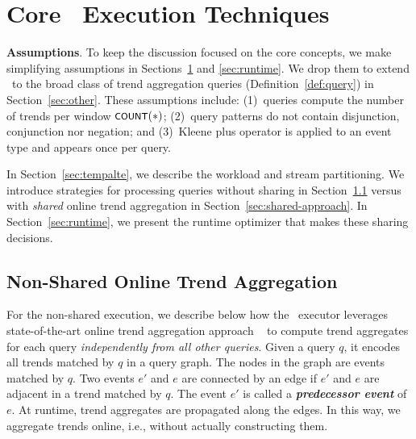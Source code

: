 \section{Core \app\ Execution Techniques}
\label{sec:executor}

\textbf{Assumptions}.
To keep the discussion focused on the core concepts, we make simplifying assumptions in Sections~\ref{sec:executor} and \ref{sec:runtime}. We drop them to extend \app\ to the broad class of trend aggregation queries (Definition~\ref{def:query}) in Section~\ref{sec:other}.
These assumptions include:
(1)~queries compute the number of trends per window $\textsf{\footnotesize COUNT}(*)$;
(2)~query patterns do not contain disjunction, conjunction nor negation; and 
(3)~Kleene plus operator is applied to an event type  and appears once per query.


In Section~\ref{sec:tempalte}, we describe the workload and stream partitioning. We introduce strategies for processing  queries without sharing in Section~\ref{sec:non-shared-baseline} versus with \textit{shared} online trend aggregation in Section~\ref{sec:shared-approach}. In Section~\ref{sec:runtime}, we present the runtime optimizer that makes these sharing decisions.




\subsection{Non-Shared Online Trend Aggregation}
\label{sec:non-shared-baseline}

For the  non-shared execution, we describe below how the \app\ executor leverages state-of-the-art online trend aggregation approach
~\cite{PLRM18} to compute trend aggregates for each query {\it independently from all other queries}. Given a query $q$, it encodes all trends matched by $q$ in a query graph.
The nodes in the graph are events matched by $q$. Two events $e'$ and $e$ are connected by an edge if $e'$ and $e$ are adjacent in a trend matched by $q$. The event $e'$ is called a \textbf{\textit{predecessor event}} of $e$. At runtime, trend aggregates are propagated along the edges. In this way, 
we aggregate trends online, i.e., without actually constructing them.

